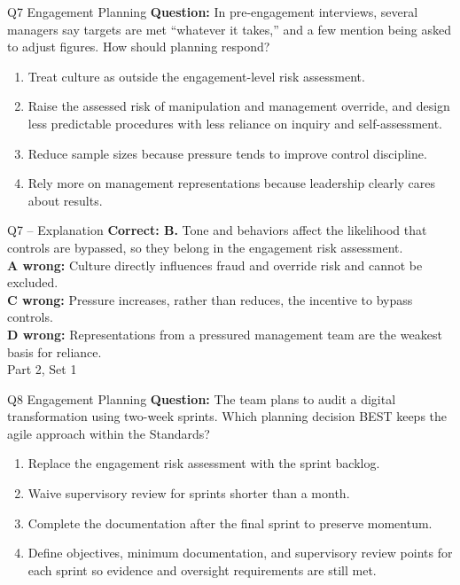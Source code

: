 \documentclass[aspectratio=169,10pt]{beamer}
\begin{document}
\begin{frame}[t]{Q7 \hfill {\scriptsize Engagement Planning}}
	\small
	\textbf{Question:} In pre-engagement interviews, several managers say targets are met ``whatever it takes,'' and a few mention being asked to adjust figures. How should planning respond?
	\begin{enumerate}[label=\Alph*.,itemsep=1pt,topsep=3pt]
			\item Treat culture as outside the engagement-level risk assessment.
			\item Raise the assessed risk of manipulation and management override, and design less predictable procedures with less reliance on inquiry and self-assessment.
			\item Reduce sample sizes because pressure tends to improve control discipline.
			\item Rely more on management representations because leadership clearly cares about results.
	\end{enumerate}
\end{frame}
\begin{frame}[t]{Q7 -- Explanation}
	\footnotesize
	\textbf{Correct: B.} Tone and behaviors affect the likelihood that controls are bypassed, so they belong in the engagement risk assessment. \\[5pt]
\textbf{A wrong:} Culture directly influences fraud and override risk and cannot be excluded. \\[3pt]
\textbf{C wrong:} Pressure increases, rather than reduces, the incentive to bypass controls. \\[3pt]
\textbf{D wrong:} Representations from a pressured management team are the weakest basis for reliance. \\[3pt]
	\vfill {\tiny Part 2, Set 1}
\end{frame}
\begin{frame}[t]{Q8 \hfill {\scriptsize Engagement Planning}}
	\small
	\textbf{Question:} The team plans to audit a digital transformation using two-week sprints. Which planning decision BEST keeps the agile approach within the Standards?
	\begin{enumerate}[label=\Alph*.,itemsep=1pt,topsep=3pt]
			\item Replace the engagement risk assessment with the sprint backlog.
			\item Waive supervisory review for sprints shorter than a month.
			\item Complete the documentation after the final sprint to preserve momentum.
			\item Define objectives, minimum documentation, and supervisory review points for each sprint so evidence and oversight requirements are still met.
	\end{enumerate}
\end{frame}
\end{document}
